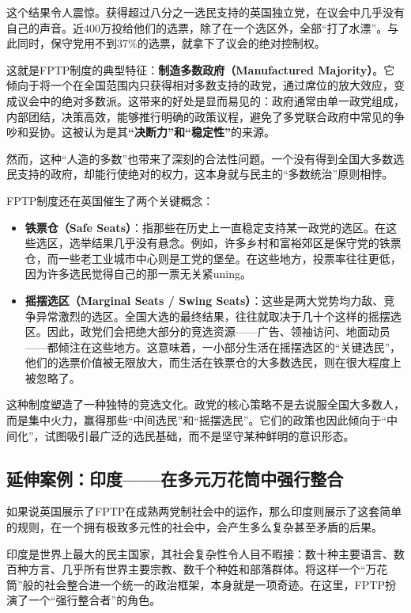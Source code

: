 这个结果令人震惊。获得超过八分之一选民支持的英国独立党，在议会中几乎没有自己的声音。近400万投给他们的选票，除了在一个选区外，全部“打了水漂”。与此同时，保守党用不到37\%的选票，就拿下了议会的绝对控制权。

这就是FPTP制度的典型特征：\textbf{制造多数政府（Manufactured Majority）}。它倾向于将一个在全国范围内只获得相对多数支持的政党，通过席位的放大效应，变成议会中的绝对多数派。这带来的好处是显而易见的：政府通常由单一政党组成，内部团结，决策高效，能够推行明确的政策议程，避免了多党联合政府中常见的争吵和妥协。这被认为是其\textbf{“决断力”和“稳定性”}的来源。

然而，这种“人造的多数”也带来了深刻的合法性问题。一个没有得到全国大多数选民支持的政府，却能行使绝对的权力，这本身就与民主的“多数统治”原则相悖。

FPTP制度还在英国催生了两个关键概念：

\begin{itemize}
    \item \textbf{铁票仓（Safe Seats）}：指那些在历史上一直稳定支持某一政党的选区。在这些选区，选举结果几乎没有悬念。例如，许多乡村和富裕郊区是保守党的铁票仓，而一些老工业城市中心则是工党的堡垒。在这些地方，投票率往往更低，因为许多选民觉得自己的那一票无关紧uning。
    \item \textbf{摇摆选区（Marginal Seats / Swing Seats）}：这些是两大党势均力敌、竞争异常激烈的选区。全国大选的最终结果，往往就取决于几十个这样的摇摆选区。因此，政党们会把绝大部分的竞选资源——广告、领袖访问、地面动员——都倾注在这些地方。这意味着，一小部分生活在摇摆选区的“关键选民”，他们的选票价值被无限放大，而生活在铁票仓的大多数选民，则在很大程度上被忽略了。
\end{itemize}

这种制度塑造了一种独特的竞选文化。政党的核心策略不是去说服全国大多数人，而是集中火力，赢得那些“中间选民”和“摇摆选民”。它们的政策也因此倾向于“中间化”，试图吸引最广泛的选民基础，而不是坚守某种鲜明的意识形态。

\subsection{延伸案例：印度——在多元万花筒中强行整合}

如果说英国展示了FPTP在成熟两党制社会中的运作，那么印度则展示了这套简单的规则，在一个拥有极致多元性的社会中，会产生多么复杂甚至矛盾的后果。

印度是世界上最大的民主国家，其社会复杂性令人目不暇接：数十种主要语言、数百种方言、几乎所有世界主要宗教、数千个种姓和部落群体。将这样一个“万花筒”般的社会整合进一个统一的政治框架，本身就是一项奇迹。在这里，FPTP扮演了一个“强行整合者”的角色。

